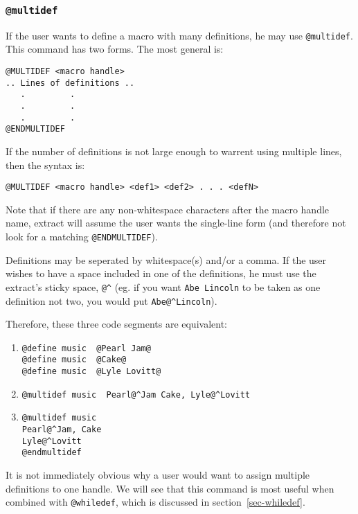 \subsubsection{\tt @multidef}
If the user wants to define a macro with many definitions, he may use
{\tt @multidef}.  This command has two forms.  The most general is:
\begin{verbatim}
@MULTIDEF <macro handle>
.. Lines of definitions ..
   .         .
   .         .
   .         .
@ENDMULTIDEF
\end{verbatim}

If the number of definitions is not large enough to warrent using multiple lines,
then the syntax is:
\begin{verbatim}
@MULTIDEF <macro handle> <def1> <def2> . . . <defN>
\end{verbatim}

Note that if there are any non-whitespace characters after the macro handle name,
extract will assume the user wants the single-line form (and therefore not look
for a matching \verb+@ENDMULTIDEF+).

Definitions may be seperated by whitespace(s) and/or a comma.  If the user
wishes to have a space included in one of the definitions, he must use
the extract's sticky space, 
\verb+@^+ (eg. if you want {\tt Abe Lincoln} to be taken as one definition
not two, you would put \verb+Abe@^Lincoln+).

Therefore, these three code segments are equivalent:

\begin{enumerate}

\item
\begin{verbatim}
@define music  @Pearl Jam@
@define music  @Cake@
@define music  @Lyle Lovitt@
\end{verbatim}

\item
\begin{verbatim}
@multidef music  Pearl@^Jam Cake, Lyle@^Lovitt
\end{verbatim}

\item
\begin{verbatim}
@multidef music 
Pearl@^Jam, Cake
Lyle@^Lovitt
@endmultidef
\end{verbatim}
\end{enumerate}

It is not immediately obvious why a user would want to assign multiple definitions
to one handle.  We will see that this command is most useful when combined with
{\tt @whiledef}, which is discussed in section~\ref{sec-whiledef}.

